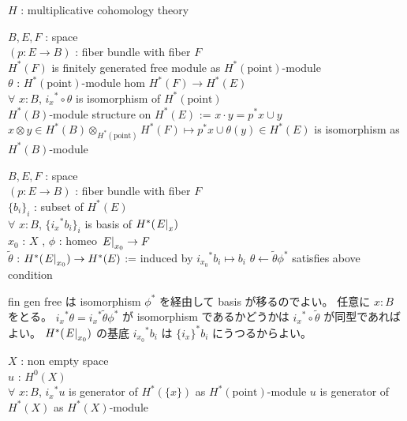 \documentclass[dvipdfmx]{jsarticle}
\begin{document}
\begin{When}
\itemwhen \(H\) : multiplicative cohomology theory
\end{When}

\begin{Theorem}
\itemwhen
  \For \(B,E,F\) : space \\
  \For \((p: E \to B)\) : fiber bundle with fiber \(F\) \\
  \IfHold \(H^*(F)\) is finitely generated free module as \(H^*(\text{point})\)-module \\
  \For \(\theta\) : \(H^*(\text{point})\)-module hom \(H^*(F) \to H^*(E)\) \\
  \IfHold \(\forall\) \(x:B\), \({i_x}^* \circ \theta\) is isomorphism of \(H^*(\text{point})\) \\
  \Let \(H^*(B)\)-module structure on \(H^*(E)\) := \(x \cdot y = p^*x \cup y\)
\itemprop
  \Then \(x \otimes y \in H^*(B) \otimes_{H^*(\text{point})} H^*(F) \mapsto p^* x \cup \theta(y) \in H^*(E)\) is isomorphism as \(H^*(B)\)-module
\end{Theorem}

\begin{Theorem}
\itemwhen
  \For \(B,E,F\) : space \\
  \For \((p: E \to B)\) : fiber bundle with fiber \(F\) \\
  \For \(\{b_i\}_i\) : subset of \(H^*(E)\) \\
  \IfHold \(\forall\) \(x:B\), \(\{{i_x}^* b_i\}_i\) is basis of \(H^*(\left. {E} \right| _{x})\) \\
  \For \(x_0\) : \(X\) , \(\phi\) : homeo \(\left. {E} \right| _{x_0} \to F\) \\
  \Let \(\tilde{\theta}\) : \(H^*(\left. {E} \right| _{x_0}) \to H^*(E)\) := induced by \({i_{x_0}}^* b_i \mapsto b_i\)
\itemprop
  \Then \(\theta \leftarrow \tilde{\theta} \phi^*\) satisfies above condition
\end{Theorem}

\begin{Proof}
\itemprof
  fin gen free は isomorphism \(\phi^*\) を経由して basis が移るのでよい。
  任意に \(x:B\) をとる。 \({i_x}^* \theta = {i_x}^* \tilde{\theta} \phi^*\) が isomorphism であるかどうかは \({i_x}^* \circ \tilde{\theta}\) が同型であればよい。
  \(H^*(\left. {E} \right| _{x_0})\) の基底 \({i_{x_0}}^* b_i\) は \(\{i_{x}\}^* b_i\) にうつるからよい。
\end{Proof}

\begin{Theorem}
\itemwhen
  \For \(X\) : non empty space \\
  \For \(u\) : \(H^0(X)\) \\
  \IfHold \(\forall\) \(x:B\), \({i_x}^* u\) is generator of \(H^*(\{x\})\) as \(H^*(\text{point})\)-module
\itemprop
  \Then \(u\) is generator of \(H^*(X)\) as \(H^*(X)\)-module
\end{Theorem}
\end{document}
